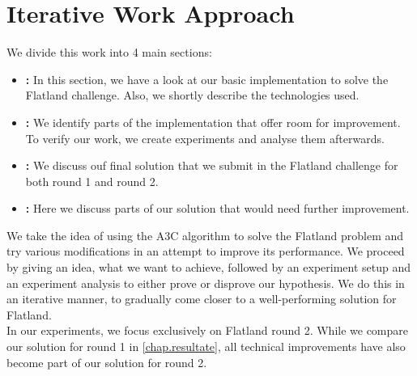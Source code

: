\section{Iterative Work Approach}\label{basic_cons}
We divide this work into 4 main sections:
\begin{itemize}
	\item \textbf{:} In this section, we have a look at our basic implementation to solve the Flatland challenge. Also, we shortly describe the technologies used.
	\item \textbf{:} We identify parts of the implementation that offer room for improvement. To verify our work, we create experiments and analyse them afterwards.
	\item \textbf{:} We discuss ouf final solution that we submit in the Flatland challenge for both round 1 and round 2.
	\item \textbf{:} Here we discuss parts of our solution that would need further improvement.
\end{itemize}
We take the idea of using the A3C algorithm to solve the Flatland problem and try various modifications in an attempt to improve its performance. We proceed by giving an idea, what we want to achieve, followed by an experiment setup and an experiment analysis to either prove or disprove our hypothesis. We do this in an iterative manner, to gradually come closer to a well-performing solution for Flatland.\\
In our experiments, we focus exclusively on Flatland round 2. While we compare our solution for round 1 in \autoref{chap.resultate}, all technical improvements have also become part of our solution for round 2.

